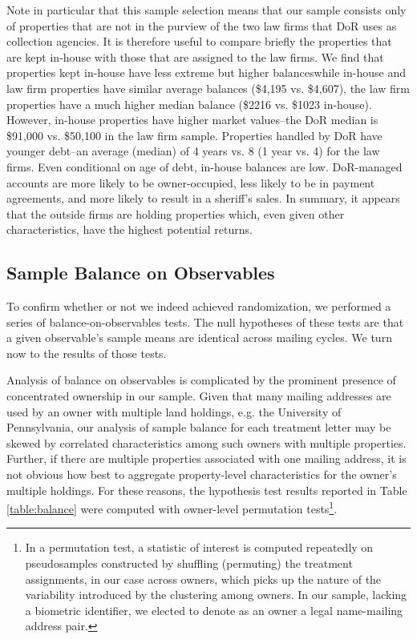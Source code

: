 \documentclass[12pt,titlepage]{article}
\begin{document}
Note in particular that this sample selection means that our sample
consists only of properties that are not in the purview of the two law
firms that DoR uses as collection agencies. It is therefore useful to
compare briefly the properties that are kept in-house with those that
are assigned to the law firms. We find that properties kept in-house
have less extreme but higher balances\textemdash while in-house and
law firm properties have similar average balances (\$4,195 vs. \$4,607),
the law firm properties have a much higher median balance (\$2216 vs.
\$1023 in-house). However, in-house properties have higher market values--the
DoR median is \$91,000 vs. \$50,100 in the law firm sample. Properties handled by DoR
have younger debt--an average (median) of 4 years vs. 8 (1 year vs. 4) for the law
firms.  Even conditional on age of debt, in-house balances are low.
DoR-managed accounts are more likely to be owner-occupied, less likely
to be in payment agreements, and more likely to result in a sheriff's
sales. In summary, it appears that the outside firms are holding
properties which, even given other characteristics, have the highest
potential returns.

\subsection{Sample Balance on Observables}

To confirm whether or not we indeed achieved randomization, we
performed a series of balance-on-observables tests. The null
hypotheses of these tests are that a given observable's sample means are
identical across mailing cycles. We turn now to the results of those
tests.

Analysis of balance on observables is complicated by the prominent
presence of concentrated ownership in our sample. Given that many mailing 
addresses are used by an owner with multiple land holdings, e.g. the University
of Pennsylvania, our analysis of sample balance for each
treatment letter may be skewed by correlated characteristics among such owners
with multiple properties.  Further, if there are multiple properties
associated with one mailing address, it is not obvious how best to
aggregate property-level characteristics for the owner's multiple
holdings.  For these reasons, the hypothesis test results reported in
Table \ref{table:balance} were computed with owner-level permutation
tests\footnote{In a permutation test, a statistic of interest is computed
repeatedly on pseudosamples constructed by shuffling (permuting) the treatment
assignments, in our case across owners, which picks up the nature of the
variability introduced by the clustering among owners. In our sample, lacking
a biometric identifier, we elected to denote as an owner a legal name-mailing
address pair.}.
  
\end{document}

